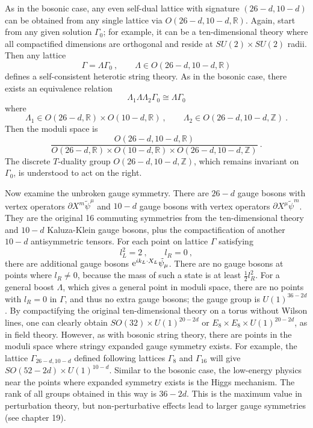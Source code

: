 As in the bosonic case, any even self-dual lattice with signature $(26-d,10-d)$ can be obtained from any single lattice via $O(26-d,10-d,\mathds{R})$. Again, start from any given solution $\Gamma_{0}$; for example, it can be a ten-dimensional theory where all compactified dimensions are orthogonal and reside at $SU(2)\times SU(2)$ radii. Then any lattice
\begin{equation}
	\Gamma=\Lambda\Gamma_{0} \:,\qquad \Lambda\in O(26-d,10-d,\mathds{R}) \label{11.6.11}
\end{equation}
defines a self-consistent heterotic string theory. As in the bosonic case, there exists an equivalence relation
\begin{equation}
	\Lambda_{1}\Lambda\Lambda_{2}\Gamma_{0} \cong \Lambda\Gamma_{0} \label{11.6.12}
\end{equation}
where
\begin{equation}
	\Lambda_{1} \in O(26-d,\mathds{R})\times O(10-d,\mathds{R}) \:,\qquad
	\Lambda_{2} \in O(26-d,10-d,\mathds{Z}) \:. \label{11.6.13}
\end{equation}
Then the moduli space is
\begin{equation}
	\frac{ O(26-d,10-d,\mathds{R})}{ O(26-d,\mathds{R})\times O(10-d,\mathds{R})\times  O(26-d,10-d,\mathds{Z})}\:.
	\label{11.6.14}
\end{equation}
The discrete $T$-duality group $O(26-d,10-d,\mathds{Z})$, which remains invariant on $\Gamma_{0}$, is understood to act on the right.

Now examine the unbroken gauge symmetry. There are $26{-}d$ gauge bosons with vertex operators $\partial X^{m}\tilde{\psi}^{\mu}$ and $10{-}d$ gauge bosons with vertex operators $\partial X^{\mu}\tilde{\psi}^{m}$. They are the original 16 commuting symmetries from the ten-dimensional theory and $10-d$ Kaluza-Klein gauge bosons, plus the compactification of another $10-d$ antisymmetric tensors. For each point on lattice $\Gamma$ satisfying
\begin{equation}
	l_{L}^{2}=2 \:, \qquad l_{R}=0 \:, \label{11.6.15}    
\end{equation}
there are additional gauge bosons $\mathrm{e}^{i k_{L}\cdot X_{L}}\tilde{\psi}_{\mu}$. There are no gauge bosons at points where $l_{R}\neq 0$, because the mass of such a state is at least $\frac{1}{2}l_{R}^{2}$. For a general boost $\Lambda$, which gives a general point in moduli space, there are no points with $l_{R}=0$ in $\Gamma$, and thus no extra gauge bosons; the gauge group is $U(1)^{36-2d}$. By compactifying the original ten-dimensional theory on a torus without Wilson lines, one can clearly obtain $SO(32)\times U(1)^{20-2d}$ or $E_{8}\times E_{8}\times U(1)^{20-2d}$, as in field theory. However, as with bosonic string theory, there are points in the moduli space where stringy expanded gauge symmetry exists. For example, the lattice $\Gamma_{26-d,10-d}$ defined following lattices $\Gamma_{8}$ and $\Gamma_{16}$ will give $SO(52-2d)\times U(1)^{10-d}$. Similar to the bosonic case, the low-energy physics near the points where expanded symmetry exists is the Higgs mechanism. The rank of all groups obtained in this way is $36-2d$. This is the maximum value in perturbation theory, but non-perturbative effects lead to larger gauge symmetries (see chapter 19).

